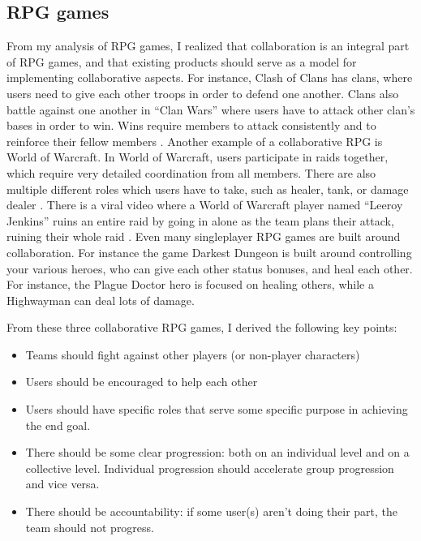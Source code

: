 \documentclass{l4proj}
\begin{document}
\subsection{RPG games}
From my analysis of RPG games, I realized that collaboration is an integral part of RPG games, and that existing products should serve as a model for implementing collaborative aspects. For instance, Clash of Clans has clans, where users need to give each other troops in order to defend one another. Clans also battle against one another in ``Clan Wars'' where users have to attack other clan's bases in order to win. Wins require members to attack consistently and to reinforce their fellow members \citep{coc}. 
Another example of a collaborative RPG is World of Warcraft. In World of Warcraft, users participate in raids together, which require very detailed coordination from all members. There are also multiple different roles which users have to take, such as healer, tank, or damage dealer \citep{wow}. There is a viral video where a World of Warcraft player named ``Leeroy Jenkins'' ruins an entire raid by going in alone as the team plans their attack, ruining their whole raid \citep{leeroy_jenkins}. Even many singleplayer RPG games are built around collaboration. For instance the game Darkest Dungeon \citep{darkest_dungeon} is built around controlling your various heroes, who can give each other status bonuses, and heal each other. For instance, the Plague Doctor hero is focused on healing others, while a Highwayman can deal lots of damage. 

From these three collaborative RPG games, I derived the following key points:
\begin{itemize}    
    \item
      Teams should fight against other players (or non-player characters)
    \item
      Users should be encouraged to help each other
    \item
      Users should have specific roles that serve some specific purpose in achieving the end goal.
    \item 
      There should be some clear progression: both on an individual level and on a collective level. Individual progression should accelerate group progression and vice versa.
    \item 
      There should be accountability: if some user(s) aren't doing their part, the team should not progress.
\end{itemize}


\end{document}
